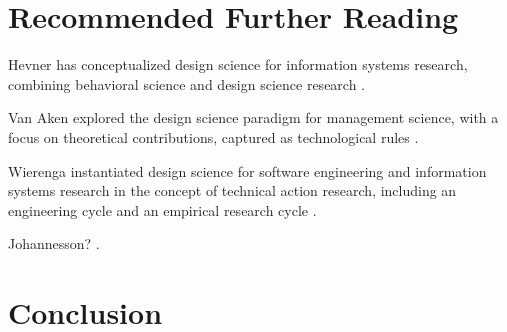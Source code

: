 \documentclass[graybox]{svmult}
\begin{document}
\section{Recommended Further Reading}

Hevner has conceptualized design science for information systems research, combining behavioral science and design science research \cite{hevner_design_2004,hevner_design_2010}.

Van Aken explored the design science paradigm for management science, with a focus on theoretical contributions, captured as technological rules \cite{van_aken_management_2004,van_aken_management_2005}. 

Wierenga instantiated design science for software engineering and information systems research in the concept of technical action research, including an engineering cycle and an empirical research cycle \cite{wieringa_design_2009,wieringa_six_2015,wieringa_technical_2012,wieringa_what_2014}.

Johannesson? \cite{johannesson_introduction_2014}.

\section{Conclusion}





\end{document}
